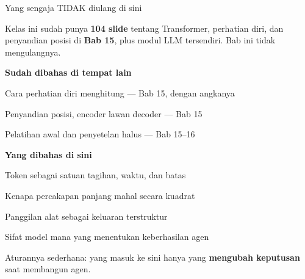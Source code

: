 \documentclass[aspectratio=169,11pt,t]{beamer}
\begin{document}
\begin{frame}[shrink=25]{Yang sengaja TIDAK diulang di sini}
{\fontsize{9.4}{12.6}\selectfont\color{fg2}Kelas ini sudah punya \textbf{104 slide} tentang Transformer, perhatian diri, dan penyandian posisi di \textbf{Bab 15}, plus modul LLM tersendiri. Bab ini tidak mengulangnya.\par}\vskip 4pt
\begin{minipage}[t]{0.485\textwidth}
{\fontsize{9.4}{12.6}\selectfont\color{fg2}\textbf{Sudah dibahas di tempat lain}\par}\vskip 4pt
\begin{ibullets}
\item Cara perhatian diri menghitung --- Bab 15, dengan angkanya
\item Penyandian posisi, encoder lawan decoder --- Bab 15
\item Pelatihan awal dan penyetelan halus --- Bab 15--16
\end{ibullets}

\end{minipage}%
\hfill
\begin{minipage}[t]{0.485\textwidth}
{\fontsize{9.4}{12.6}\selectfont\color{fg2}\textbf{Yang dibahas di sini}\par}\vskip 4pt
\begin{ibullets}
\item Token sebagai satuan tagihan, waktu, dan batas
\item Kenapa percakapan panjang mahal secara kuadrat
\item Panggilan alat sebagai keluaran terstruktur
\item Sifat model mana yang menentukan keberhasilan agen
\end{ibullets}

\end{minipage}%
\begin{iband}[signal]
Aturannya sederhana: yang masuk ke sini hanya yang \textbf{mengubah keputusan} saat membangun agen.
\end{iband}
\end{frame}

\end{document}
